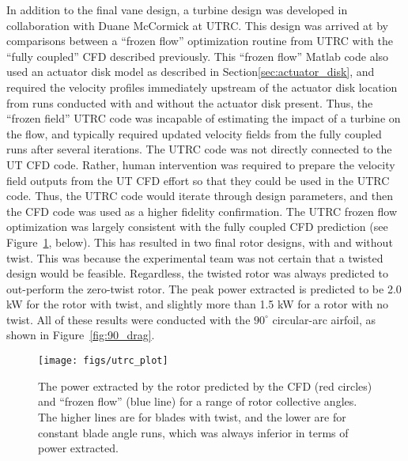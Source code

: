 In addition to the final vane design, a turbine design was developed in
collaboration with Duane McCormick at UTRC. This design was arrived at
by comparisons between a ``frozen flow'' optimization routine from UTRC 
with the ``fully coupled'' CFD described previously. This ``frozen
flow'' Matlab code also used an actuator disk model as described in 
Section\ref{sec:actuator_disk}, and required the velocity profiles
immediately upstream of the actuator disk location from runs conducted
with and without the actuator disk present. Thus, the ``frozen field''
UTRC code was incapable of estimating the impact of a turbine on the
flow, and typically required updated velocity fields from the fully
coupled runs after several iterations. 
The UTRC code was not directly connected to the UT CFD code. Rather,
human intervention was required to prepare the velocity field outputs
from the UT CFD effort so that they could be used in the UTRC
code. Thus, the UTRC code would iterate through design parameters, and
then the CFD code was used as a higher fidelity confirmation. The UTRC
frozen flow optimization was largely consistent with the fully coupled
CFD prediction (see  Figure~\ref{fig:UTRC_turbine}, below). This has
resulted in two final rotor designs, with and without twist. This was
because the experimental team was not certain that a twisted design
would be feasible. Regardless, the twisted rotor was always predicted to 
out-perform the zero-twist rotor.  
The peak power extracted is predicted to be 2.0 kW for the rotor
with twist, and slightly more than 1.5 kW for a rotor with no twist. 
All of these results were conducted with the $90^{\circ}$ circular-arc
airfoil, as shown in Figure~\ref{fig:90_drag}. 

  \begin{figure}[!htb]
   \begin{center}
    \texttt{[image: figs/utrc\_plot]}
    \caption{The power extracted by the rotor predicted by the CFD (red
    circles) and ``frozen flow'' (blue line) for a range of rotor
    collective angles. The higher lines are for blades with twist, and
    the lower are for constant blade angle runs, which was always
    inferior in terms of power extracted.}
    \label{fig:UTRC_turbine}
   \end{center}
  \end{figure}

